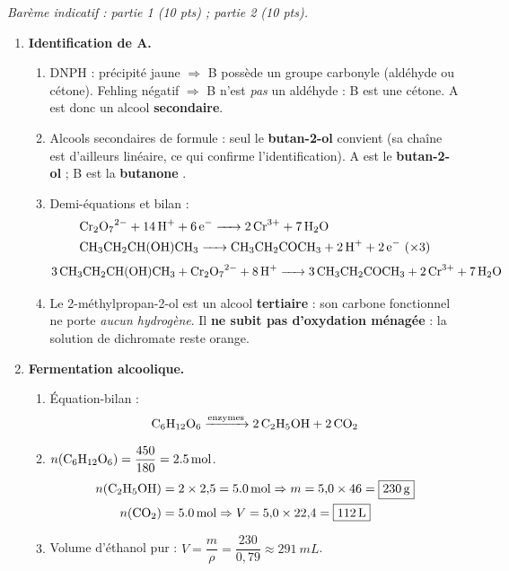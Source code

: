 \documentclass[11pt]{article}
\newcommand{\cle}[1]{{\popxbold\color{popdark}#1}}
\begin{document}
\begin{corrige}
\emph{Barème indicatif : partie 1 (10 pts) ; partie 2 (10 pts).}

\begin{enumerate}
\item \textbf{Identification de A.}
\begin{enumerate}
\item DNPH : précipité jaune $\Rightarrow$ B possède un \cle{groupe carbonyle} (aldéhyde ou cétone). Fehling négatif $\Rightarrow$ B n'est \emph{pas} un aldéhyde : B est une \cle{cétone}. A est donc un alcool \textbf{secondaire}.
\item Alcools secondaires de formule  : seul le \textbf{butan-2-ol}  convient (sa chaîne est d'ailleurs linéaire, ce qui confirme l'identification). A est le \textbf{butan-2-ol} ; B est la \textbf{butanone} .
\item Demi-équations et bilan :
\begin{align*}
& \ce{Cr2O7^2- + 14 H+ + 6 e- -> 2 Cr^3+ + 7 H2O}\\
& \ce{CH3CH2CH(OH)CH3 -> CH3CH2COCH3 + 2 H+ + 2 e-} \ (\times 3)
\end{align*}
\[ \ce{3 CH3CH2CH(OH)CH3 + Cr2O7^2- + 8 H+ -> 3 CH3CH2COCH3 + 2 Cr^3+ + 7 H2O} \]
\item Le 2-méthylpropan-2-ol  est un alcool \textbf{tertiaire} : son carbone fonctionnel ne porte \emph{aucun hydrogène}. Il \textbf{ne subit pas d'oxydation ménagée} : la solution de dichromate reste orange.
\end{enumerate}
\item \textbf{Fermentation alcoolique.}
\begin{enumerate}
\item Équation-bilan :
\[ \ce{C6H12O6 ->[enzymes] 2 C2H5OH + 2 CO2} \]
\item $n(\ce{C6H12O6}) = \dfrac{450}{180} = \SI{2,5}{mol}$.
\begin{align*}
n(\ce{C2H5OH}) &= 2 \times 2{,}5 = \SI{5,0}{mol} \Rightarrow m = 5{,}0 \times 46 = \boxed{\SI{230}{g}} \\
n(\ce{CO2}) &= \SI{5,0}{mol} \Rightarrow V = 5{,}0 \times 22{,}4 = \boxed{\SI{112}{L}}
\end{align*}
\item Volume d'éthanol pur : $V = \dfrac{m}{\rho} = \dfrac{230}{0{,}79} \approx \SI{291}{mL}$.

\end{enumerate}
\end{enumerate}
\end{corrige}
\end{document}
